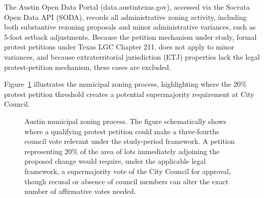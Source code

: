 \documentclass[11pt, letterpaper]{article}
\begin{document}
The Austin Open Data Portal (data.austintexas.gov), accessed via the Socrata Open Data API (SODA), records all administrative zoning activity, including both substantive rezoning proposals and minor administrative variances, such as 5-foot setback adjustments. Because the petition mechanism under study, formal protest petitions under Texas LGC Chapter 211, does not apply to minor variances, and because extraterritorial jurisdiction (ETJ) properties lack the legal protest-petition mechanism, these cases are excluded.

Figure~\ref{fig:flowchart} illustrates the municipal zoning process, highlighting where the 20\% protest petition threshold creates a potential supermajority requirement at City Council.

\begin{figure}[H]
\centering
{}
\caption[Schematic of the Austin Zoning Process]{Austin municipal zoning process. The figure schematically shows where a qualifying protest petition could make a three-fourths council vote relevant under the study-period framework. A petition representing 20\% of the area of lots immediately adjoining the proposed change would require, under the applicable legal framework, a supermajority vote of the City Council for approval, though recusal or absence of council members can alter the exact number of affirmative votes needed.}
\label{fig:flowchart}
\end{figure}
\end{document}
